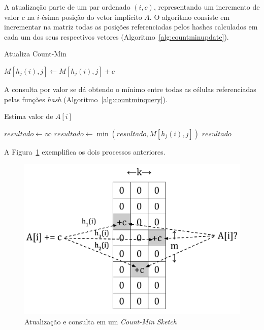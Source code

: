 A atualização parte de um par ordenado $(i, c)$, representando um incremento de valor $c$ na $i$-ésima posição do vetor implícito $A$. O algoritmo consiste em incrementar na matriz todas as posições referenciadas pelos hashes calculados em cada um dos seus respectivos vetores (Algoritmo~\ref{alg:countminupdate}). 

\begin{algorithm}
\linespread{1}\selectfont
\caption{Atualiza Count-Min}
\label{alg:countminupdate}
\begin{algorithmic}[1]
        \State $M[h_j(i), j] \gets M[h_j(i), j] + c$
	\EndFor
\EndProcedure
\end{algorithmic}
\end{algorithm}

A consulta por valor se dá obtendo o mínimo entre todas as células referenciadas pelas funções \emph{hash}  (Algoritmo~\ref{alg:countminquery}).

\begin{algorithm}
\linespread{1}\selectfont
\caption{Estima valor de $A[i]$}
\label{alg:countminquery}
\begin{algorithmic}[1]
    \State $resultado \gets \infty$ 
        \State $resultado \gets \min(resultado, M[h_j(i), j])$
	\EndFor
	\Return $resultado$
\EndFunction
\end{algorithmic}
\end{algorithm}

A Figura~\ref{fig:countmin1} exemplifica os dois processos anteriores.

\begin{figure}[!htbp]
  \centering
  \includegraphics[scale=0.45]{figures/countmin1.pdf}
  \caption{Atualização e consulta em um \emph{Count-Min Sketch}}
  \label{fig:countmin1}
\end{figure}


